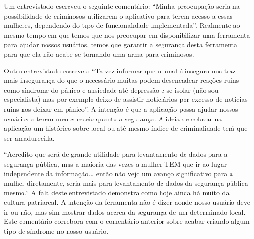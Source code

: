 Um entrevistado escreveu o seguinte comentário: “Minha preocupação seria na possibilidade de criminosos utilizarem o aplicativo para terem acesso a essas mulheres, dependendo do tipo de funcionalidade implementada”. Realmente ao mesmo tempo em que temos que nos preocupar em disponibilizar uma ferramenta para ajudar nossos usuários, temos que garantir a segurança desta ferramenta para que ela não acabe se tornando uma arma para criminosos.

Outro entrevistado escreveu: “Talvez informar que o local é inseguro nos traz mais insegurança do que o necessário muitas podem desencadear reações ruins como síndrome do pânico e ansiedade até depressão e se isolar (não sou especialista) mas por exemplo deixo de assistir noticiários por excesso de notícias ruins nos deixar em pânico”. A intenção é que a aplicação possa ajudar nossos usuários a terem menos receio quanto a segurança. A ideia de colocar na aplicação um histórico sobre local ou até mesmo índice de criminalidade terá que ser amadurecida.

“Acredito que será de grande utilidade para levantamento de dados para a segurança pública, mas a maioria das vezes a mulher TEM que ir ao lugar independente da informação... então não vejo um avanço significativo para a mulher diretamente, seria mais para levantamento de dados da segurança pública mesmo.” A fala deste entrevistado demonstra como hoje ainda há muito da cultura patriarcal. A intenção da ferramenta não é dizer aonde nosso usuário deve ir ou não, mas sim mostrar dados acerca da segurança de um determinado local. Este comentário corrobora com o comentário anterior sobre acabar criando algum tipo de síndrome no nosso usuário.

